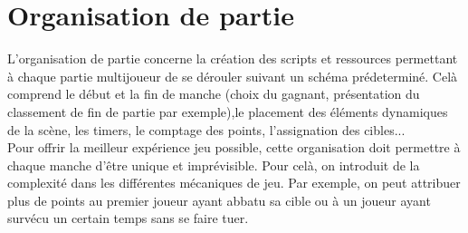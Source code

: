 \documentclass[../doc.tex ]{subfiles}
\begin{document}
\section{Organisation de partie}
L'organisation de partie concerne la création des scripts
et ressources permettant à chaque partie multijoueur de se dérouler suivant un schéma prédeterminé. Celà comprend le début et 
la fin de manche (choix du gagnant, présentation du classement
de fin de partie par exemple),le placement des éléments dynamiques de la scène,
les timers, le comptage des points, l'assignation des cibles...
\\

\indent
Pour offrir la meilleur expérience jeu possible, cette organisation
doit permettre à chaque manche d'être unique et imprévisible.
Pour celà, on introduit de la complexité dans les différentes
mécaniques de jeu. Par exemple, on peut attribuer plus de points
au premier joueur ayant abbatu sa cible ou à un joueur ayant
survécu un certain temps sans se faire tuer.
\end{document}
